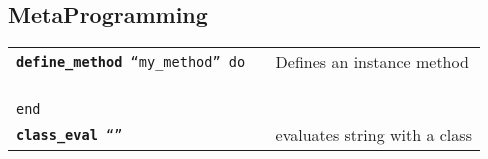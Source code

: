 \documentclass[6pt]{article}
\begin{document}
\begin{multicols}{3}
  \section{MetaProgramming}
  \begin{tabular}{L{0.55\linewidth} L{0.45\linewidth}}
    \tt \textbf{define\_method} ``my\_method'' do & Defines an instance method \\
    \tt ~~ \\
    \tt end \\
    \tt \textbf{class\_eval} ``'' & evaluates string with a class \\
  \end{tabular}


\end{multicols}
\end{document}
